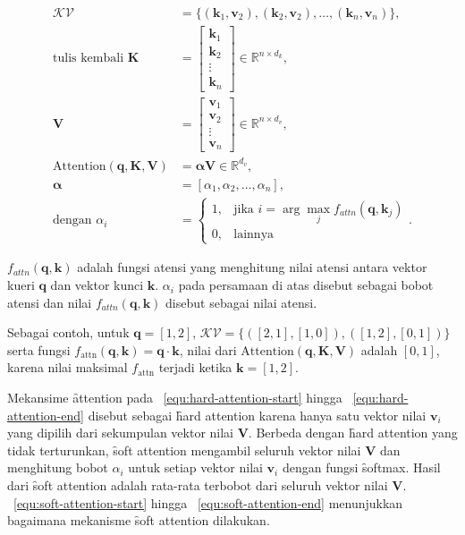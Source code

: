 \begin{align}
	\label{equ:hard-attention-start}
	\mathcal{KV} &= \{(\mathbf{k}_1, \mathbf{v}_2), (\mathbf{k}_2, \mathbf{v}_2), \dots, (\mathbf{k}_n, \mathbf{v}_n)\}, \\
	\text{tulis kembali }\mathbf{K}&= \begin{bmatrix}
		\mathbf{k}_1 \\
		\mathbf{k}_2 \\
		\vdots \\
		\mathbf{k}_n
	\end{bmatrix} \in \mathbb{R}^{n \times d_k}, \\
	\mathbf{V} &= \begin{bmatrix}
		\mathbf{v}_1 \\
		\mathbf{v}_2 \\
		\vdots \\
		\mathbf{v}_n
	\end{bmatrix} \in \mathbb{R}^{n \times d_v}, \\
	\text{Attention}(\mathbf{q}, \mathbf{K}, \mathbf{V}) &= \bm{\alpha}\mathbf{V} \in \mathbb{R}^{d_v},\\
	\bm{\alpha} &= [\alpha_{1}, \alpha_{2}, \dots, \alpha_{n}], \\
	\label{equ:hard-attention-end}
	\text{dengan } \alpha_i &= 
	\begin{cases}
	1, & \text{jika } i = \arg\max_{j} f_{attn}(\mathbf{q}, \mathbf{k}_j) \\
	0, & \text{lainnya}
	\end{cases}.
	\end{align}

	$f_{attn}(\mathbf{q}, \mathbf{k})$ adalah fungsi atensi yang menghitung nilai atensi antara vektor kueri $\mathbf{q}$ dan vektor kunci $\mathbf{k}$. $\alpha_i$ pada persamaan di atas disebut sebagai bobot atensi dan nilai $f_{attn}(\mathbf{q}, \mathbf{k})$ disebut sebagai nilai atensi.

	Sebagai contoh, untuk $\mathbf{q}= [1,2]$, $\mathcal{KV} = \{([2,1],[1,0]), ([1,2],[0,1])\}$ serta fungsi $f_\text{attn}(\mathbf{q}, \mathbf{k}) =\mathbf{q}\cdot \mathbf{k}$, nilai dari $\text{Attention}( \mathbf{q}, \mathbf{K}, \mathbf{V})$ adalah $[0,1]$, karena nilai maksimal $f_\text{attn}$ terjadi ketika $\mathbf{k} = [1,2]$. 

	Mekansime \f{attention} pada \equ~\ref{equ:hard-attention-start} hingga \equ~\ref{equ:hard-attention-end} disebut sebagai \f{hard attention} karena hanya satu vektor nilai $\mathbf{v}_i$ yang dipilih dari sekumpulan vektor nilai $\mathbf{V}$. Berbeda dengan \f{hard attention} yang tidak terturunkan, \f{soft attention} mengambil seluruh vektor nilai $\mathbf{V}$ dan menghitung bobot $\alpha_i$ untuk setiap vektor nilai $\mathbf{v}_i$ dengan fungsi \f{softmax}. Hasil dari \f{soft attention} adalah rata-rata terbobot dari seluruh vektor nilai $\mathbf{V}$. \equ~\ref{equ:soft-attention-start} hingga \equ~\ref{equ:soft-attention-end} menunjukkan bagaimana mekanisme \f{soft attention} dilakukan.

